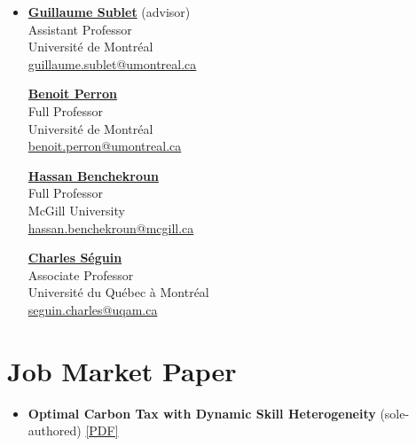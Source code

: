 \documentclass[11pt,letterpaper]{article}
\begin{document}
\begin{itemize}
\item
\begin{minipage}{\linewidth}
\begin{minipage}[t]{0.48\linewidth}
\raggedright
\href{https://guillaumesublet.github.io/}{\textbf{Guillaume Sublet}} (advisor)\\
Assistant Professor\\
Université de Montréal\\
\href{mailto:guillaume.sublet@umontreal.ca}{guillaume.sublet@umontreal.ca}
\end{minipage}
\hfill
\begin{minipage}[t]{0.48\linewidth}
\raggedright
\href{https://www.benoitperron.com/}{\textbf{Benoit Perron}}\\
Full Professor\\
Université de Montréal\\
\href{mailto:benoit.perron@umontreal.ca}{benoit.perron@umontreal.ca}
\end{minipage}

\vspace{0.8em}
\begin{minipage}[t]{0.48\linewidth}
\raggedright
\href{https://www.mcgill.ca/economics/hassan-benchekroun}{\textbf{Hassan Benchekroun}}\\
Full Professor\\
McGill University\\
\href{mailto:hassan.benchekroun@mcgill.ca}{hassan.benchekroun@mcgill.ca}
\end{minipage}
\hfill
\begin{minipage}[t]{0.48\linewidth}
\raggedright
\href{https://economie.esg.uqam.ca/corps-enseignant/professeurs/professeur/seguin.charles/}{\textbf{Charles Séguin}}\\
Associate Professor\\
Université du Québec à Montréal\\
\href{mailto:seguin.charles@uqam.ca}{seguin.charles@uqam.ca}
\end{minipage}
\end{minipage}
\end{itemize}

\section*{Job Market Paper}

\begin{itemize}
\item \textbf{Optimal Carbon Tax with Dynamic Skill Heterogeneity} (sole-authored) \href{https://alexandrepavlov.com/documents/Pigou-Mirrlees-Carbon-Tax.pdf}{[PDF]}
\end{itemize}
\end{document}
